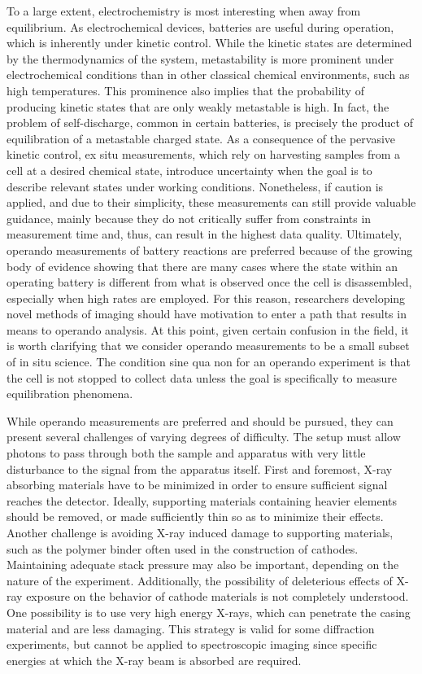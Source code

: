 \documentclass[journal=cmatex,manuscript=perspective]{achemso}
\begin{document}
To a large extent, electrochemistry is most interesting when away from
equilibrium. As electrochemical devices, batteries are useful during
operation, which is inherently under kinetic control. While the
kinetic states are determined by the thermodynamics of the system,
metastability is more prominent under electrochemical conditions than
in other classical chemical environments, such as high
temperatures. This prominence also implies that the probability of
producing kinetic states that are only weakly metastable is high. In
fact, the problem of self-discharge, common in certain batteries, is
precisely the product of equilibration of a metastable charged
state. As a consequence of the pervasive kinetic control, ex situ
measurements, which rely on harvesting samples from a cell at a
desired chemical state, introduce uncertainty when the goal is to
describe relevant states under working conditions. Nonetheless, if
caution is applied, and due to their simplicity, these measurements
can still provide valuable guidance\cite{yu2015-2}, mainly because
they do not critically suffer from constraints in measurement time
and, thus, can result in the highest data quality. Ultimately,
operando measurements of battery reactions are preferred because of
the growing body of evidence showing that there are many cases where
the state within an operating battery is different from what is
observed once the cell is disassembled\cite{liu2014, lim2016},
especially when high rates are employed. For this reason, researchers
developing novel methods of imaging should have motivation to enter a
path that results in means to operando analysis. At this point, given
certain confusion in the field, it is worth clarifying that we
consider operando measurements to be a small subset of in situ
science. The condition sine qua non for an operando experiment is that
the cell is not stopped to collect data unless the goal is
specifically to measure equilibration phenomena.

While operando measurements are preferred and should be pursued, they
can present several challenges of varying degrees of difficulty. The
setup must allow photons to pass through both the sample and apparatus
with very little disturbance to the signal from the apparatus
itself. First and foremost, X-ray absorbing materials have to be
minimized in order to ensure sufficient signal reaches the
detector. Ideally, supporting materials containing heavier elements
should be removed, or made sufficiently thin so as to minimize their
effects. Another challenge is avoiding X-ray induced damage to
supporting materials, such as the polymer binder often used in the
construction of cathodes. Maintaining adequate stack pressure may also
be important, depending on the nature of the
experiment\cite{borkiewicz2015}. Additionally, the possibility of
deleterious effects of X-ray exposure on the behavior of cathode
materials is not completely understood. One possibility is to use very
high energy X-rays, which can penetrate the casing
material\cite{lin2013} and are less damaging. This strategy is valid
for some diffraction experiments, but cannot be applied to
spectroscopic imaging since specific energies at which the X-ray beam
is absorbed are required.
\end{document}
